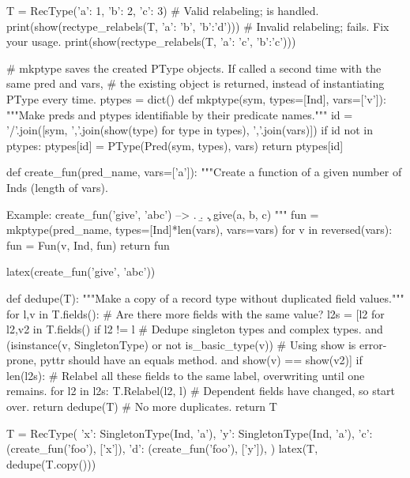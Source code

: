 \begin{cell}
T = RecType({'a': 1, 'b': 2, 'c': 3})
# Valid relabeling; is handled.
print(show(rectype_relabels(T, {'a': 'b', 'b':'d'})))
# Invalid relabeling; fails. Fix your usage.
print(show(rectype_relabels(T, {'a': 'c', 'b':'c'})))
\end{cell}

\begin{cell}
# mkptype saves the created PType objects. If called a second time with the same pred and vars,
# the existing object is returned, instead of instantiating PType every time.
ptypes = dict()
def mkptype(sym, types=[Ind], vars=['v']):
    """Make preds and ptypes identifiable by their predicate names."""
    id = '/'.join([sym, ','.join(show(type) for type in types), ','.join(vars)])
    if id not in ptypes:
        ptypes[id] = PType(Pred(sym, types), vars)
    return ptypes[id]

def create_fun(pred_name, vars=['a']):
    """Create a function of a given number of Inds (length of vars).
    
    Example: create_fun('give', 'abc') --> \a. \b. \c. give(a, b, c)
    """
    fun = mkptype(pred_name, types=[Ind]*len(vars), vars=vars)
    for v in reversed(vars):
        fun = Fun(v, Ind, fun)
    return fun

latex(create_fun('give', 'abc'))
\end{cell}

\begin{cell}
def dedupe(T):
    """Make a copy of a record type without duplicated field values."""
    for l,v in T.fields():
        # Are there more fields with the same value?
        l2s = [l2 for l2,v2 in T.fields() if l2 != l
               # Dedupe singleton types and complex types.
               and (isinstance(v, SingletonType) or not is_basic_type(v))
               # Using show is error-prone, pyttr should have an equals method.
               and show(v) == show(v2)]
        if len(l2s):
            # Relabel all these fields to the same label, overwriting until one remains.
            for l2 in l2s:
                T.Relabel(l2, l)
            # Dependent fields have changed, so start over.
            return dedupe(T)
    # No more duplicates.
    return T

T = RecType({
    'x': SingletonType(Ind, 'a'),
    'y': SingletonType(Ind, 'a'),
    'c': (create_fun('foo'), ['x']),
    'd': (create_fun('foo'), ['y']),
})
latex(T, dedupe(T.copy()))
\end{cell}

